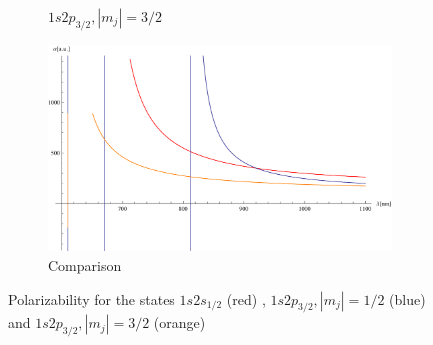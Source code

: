 \begin{figure}[H]
\begin{subfigure}[b]{0.4\textwidth}
                \caption{$1s2p_{3/2}, |m_j|=3/2$}
\end{subfigure}
\begin{subfigure}[b]{0.4\textwidth}
                \includegraphics[width=\textwidth]{alphaalltogether}
                \caption{Comparison}
\end{subfigure}




\caption{Polarizability \alpha for the states $1s2s_{1/2}$ (red) , $1s2p_{3/2}, |m_j|=1/2$ (blue) and  $1s2p_{3/2}, |m_j|=3/2$ (orange)}
\label{alphages}
\end{figure}
